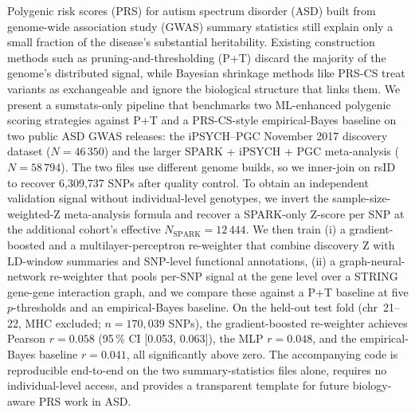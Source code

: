 Polygenic risk scores (PRS) for autism spectrum disorder (ASD) built from
genome-wide association study (GWAS) summary statistics still explain only a
small fraction of the disease's substantial heritability. Existing
construction methods such as pruning-and-thresholding (P+T) discard the
majority of the genome's distributed signal, while Bayesian shrinkage
methods like PRS-CS treat variants as exchangeable and ignore the
biological structure that links them. We present a sumstats-only pipeline
that benchmarks two ML-enhanced polygenic scoring strategies against P+T
and a PRS-CS-style empirical-Bayes baseline on two public ASD GWAS
releases: the iPSYCH--PGC November 2017 discovery dataset
($N = 46\,350$) and the larger SPARK + iPSYCH + PGC meta-analysis
($N = 58\,794$). The two files use different genome builds, so we
inner-join on rsID to recover 6{,}309{,}737 SNPs after quality control. To
obtain an independent validation signal without individual-level
genotypes, we invert the sample-size-weighted-Z meta-analysis formula and
recover a SPARK-only Z-score per SNP at the additional cohort's effective
$N_{\mathrm{SPARK}} = 12\,444$. We then train (i) a gradient-boosted and a
multilayer-perceptron re-weighter that combine discovery Z with LD-window
summaries and SNP-level functional annotations, (ii) a graph-neural-network
re-weighter that pools per-SNP signal at the gene level over a STRING
gene-gene interaction graph, and we compare these against a P+T baseline
at five $p$-thresholds and an empirical-Bayes baseline. On the held-out
test fold (chr~21--22, MHC excluded; $n = 170{,}039$ SNPs), the
gradient-boosted re-weighter achieves Pearson $r = 0.058$
(95\,\% CI [0.053, 0.063]), the MLP $r = 0.048$, and the empirical-Bayes
baseline $r = 0.041$, all significantly above zero. The accompanying code
is reproducible end-to-end on the two summary-statistics files alone,
requires no individual-level access, and provides a transparent template
for future biology-aware PRS work in ASD.
